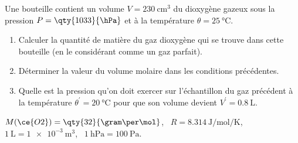 Une bouteille contient un volume $V=\qty{230}{\cubic\cm}$ du dioxygène
 gazeux sous la pression $P=\qty{1033}{\hPa}$
et à la température $\theta=\qty{25}{\degreeCelsius}$.
\begin{enumerate}
    \item Calculer la quantité de matière du gaz dioxygène qui se
          trouve dans cette bouteille (en le considérant comme un gaz
          parfait).
    \item Déterminer la valeur du volume molaire dans les conditions
          précédentes.
    \item Quelle est la pression qu'on doit exercer sur l'échantillon
          du gaz précédent à la température
          $\theta^{\prime}=\qty{20}{\degreeCelsius}$ pour que son
          volume devient $V^{\prime}=\qty{0,8}{\liter}$.
\end{enumerate}
\begin{donnees}
       $M(\ce{O2})=\qty{32}{\gram\per\mol}$, \
       $R=\qty{8,314}{\J\per\mol\per\K}$, \
       $\qty{1}{\liter}=\qty{1e-3}{\cubic\meter}$, \
       $\qty{1}{\hecto\Pa}=\qty{100}{\Pa}$.
\end{donnees}
